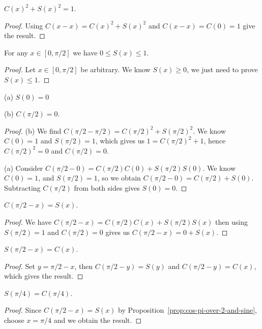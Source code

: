 \begin{proposition}
$C(x)^{2} + S(x)^{2} = 1$.
\end{proposition}
\begin{proof}
Using $C(x-x) = C(x)^{2} + S(x)^{2}$ and $C(x-x)=C(0)=1$ give the result.
\end{proof}

\begin{proposition}\label{prop:sine-leq-one-when-x-leq-pi-over-two}
For any $x\in[0,\pi/2]$ we have $0\leq S(x)\leq 1$.
\end{proposition}

\begin{proof}
Let $x\in[0,\pi/2]$ be arbitrary. We know $S(x)\geq0$, we just need to
prove $S(x)\leq1$.
\end{proof}

\begin{proposition}
  (a) $S(0) = 0$

  (b) $C(\pi/2) = 0$.
\end{proposition}
\begin{proof}
(b) We find $C(\pi/2 - \pi/2) = C(\pi/2)^{2} + S(\pi/2)^{2}$. We know
$C(0) = 1$ and $S(\pi/2) = 1$, which gives us $1 = C(\pi/2)^{2} + 1$,
hence $C(\pi/2)^{2} = 0$ and $C(\pi/2) = 0$.

(a)
Consider $C(\pi/2 - 0) = C(\pi/2)C(0) + S(\pi/2)S(0)$. We know $C(0)=1$,
and $S(\pi/2) = 1$, so we obtain $C(\pi/2 - 0) = C(\pi/2) + S(0)$.
Subtracting $C(\pi/2)$ from both sides gives $S(0)=0$.
\end{proof}

\begin{proposition}\label{prop:cos-pi-over-2-and-sine}
$C(\pi/2 - x) = S(x)$.
\end{proposition}
\begin{proof}
We have $C(\pi/2 - x) = C(\pi/2)C(x) + S(\pi/2) S(x)$
then using $S(\pi/2)=1$ and $C(\pi/2) = 0$ gives us
$C(\pi/2 - x) = 0 + S(x)$.
\end{proof}

\begin{proposition}\label{prop:sin-pi-over-2-and-cosine}
$S(\pi/2 - x) = C(x)$.
\end{proposition}
\begin{proof}
Set $y = \pi/2 - x$, then $C(\pi/2 - y) = S(y)$ and $C(\pi/2 - y) = C(x)$,
which gives the result.
\end{proof}

\begin{proposition}
$S(\pi/4) = C(\pi/4)$.
\end{proposition}
\begin{proof}
  Since $C(\pi/2 - x) = S(x)$ by Proposition~\ref{prop:cos-pi-over-2-and-sine}, choose $x=\pi/4$ and we obtain the result.
\end{proof}

